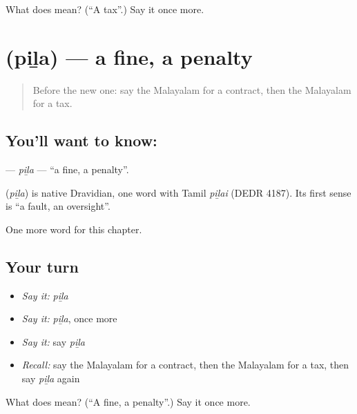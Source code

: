 \begin{tcolorbox}[breakable,colback=teal!4,colframe=teal!35!black,title={Before you move on}]
What does  mean? (\textquotedblleft{}A tax\textquotedblright{}.) Say it once more.
\end{tcolorbox}
\section[\texorpdfstring{\ml{പിഴ} (piḻa)}{പിഴ (piḻa)}]{ (piḻa) — a fine, a penalty}

\label{lesson:ML-C301-pila}



\begin{quote}
Before the new one: say the Malayalam for a contract, then the Malayalam for a tax.
\end{quote}

\subsection*{You'll want to know: }
\textbf{} — \emph{piḻa} — \textquotedblleft{}a fine, a penalty\textquotedblright{}.

\begin{cousinweb}
\textbf{} (\emph{piḻa}) is native Dravidian, one word with Tamil \emph{piḻai} (DEDR 4187). Its first sense is \textquotedblleft{}a fault, an oversight\textquotedblright{}.
\end{cousinweb}

\begin{grammarlens}[title={What you've built}]
One more word for this chapter.
\end{grammarlens}

\subsection*{Your turn}
\begin{itemize}
\raggedright
  \item \emph{Say it:} \emph{piḻa}
  \item \emph{Say it:} \emph{piḻa}, once more
  \item \emph{Say it:} say \emph{piḻa}
  \item \emph{Recall:} say the Malayalam for a contract, then the Malayalam for a tax, then say \emph{piḻa} again
\end{itemize}

\begin{tcolorbox}[breakable,colback=teal!4,colframe=teal!35!black,title={Before you move on}]
What does  mean? (\textquotedblleft{}A fine, a penalty\textquotedblright{}.) Say it once more.
\end{tcolorbox}
